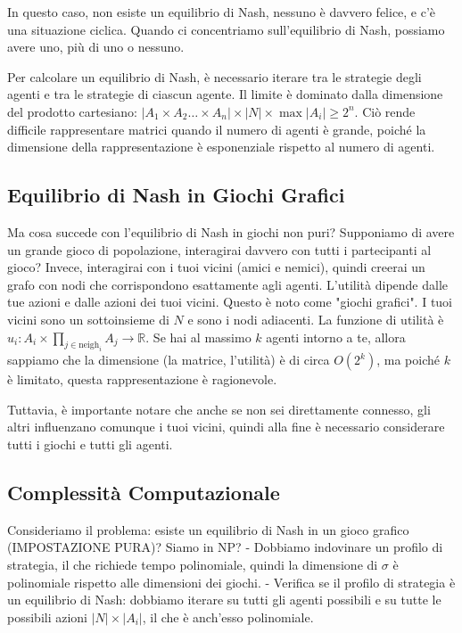 In questo caso, non esiste un equilibrio di Nash, nessuno è davvero felice, e
c'è una situazione ciclica. Quando ci concentriamo sull'equilibrio di Nash,
possiamo avere uno, più di uno o nessuno.

Per calcolare un equilibrio di Nash, è necessario iterare tra le strategie
degli agenti e tra le strategie di ciascun agente. Il limite è dominato dalla
dimensione del prodotto cartesiano: $|A_1 \times A_2 \ldots \times A_n| \times
    |N| \times \max|A_i| \geq 2^n$. Ciò rende difficile rappresentare matrici
quando il numero di agenti è grande, poiché la dimensione della
rappresentazione è esponenziale rispetto al numero di agenti.

\subsection{Equilibrio di Nash in Giochi Grafici}

Ma cosa succede con l'equilibrio di Nash in giochi non puri? Supponiamo di
avere un grande gioco di popolazione, interagirai davvero con tutti i
partecipanti al gioco? Invece, interagirai con i tuoi vicini (amici e nemici),
quindi creerai un grafo con nodi che corrispondono esattamente agli agenti.
L'utilità dipende dalle tue azioni e dalle azioni dei tuoi vicini. Questo è
noto come "giochi grafici". I tuoi vicini sono un sottoinsieme di $N$ e sono i
nodi adiacenti. La funzione di utilità è $u_i : A_i \times \prod_{j \in
        \text{neigh}_i} A_j \to \mathbb{R}$. Se hai al massimo $k$ agenti intorno a te,
allora sappiamo che la dimensione (la matrice, l'utilità) è di circa $O(2^k)$,
ma poiché $k$ è limitato, questa rappresentazione è ragionevole.

Tuttavia, è importante notare che anche se non sei direttamente connesso, gli
altri influenzano comunque i tuoi vicini, quindi alla fine è necessario
considerare tutti i giochi e tutti gli agenti.

\subsection{Complessità Computazionale}

Consideriamo il problema: esiste un equilibrio di Nash in un gioco grafico
(IMPOSTAZIONE PURA)? Siamo in NP? - Dobbiamo indovinare un profilo di
strategia, il che richiede tempo polinomiale, quindi la dimensione di $\sigma$
è polinomiale rispetto alle dimensioni dei giochi. - Verifica se il profilo di
strategia è un equilibrio di Nash: dobbiamo iterare su tutti gli agenti
possibili e su tutte le possibili azioni $|N| \times |A_i|$, il che è anch'esso
polinomiale.

